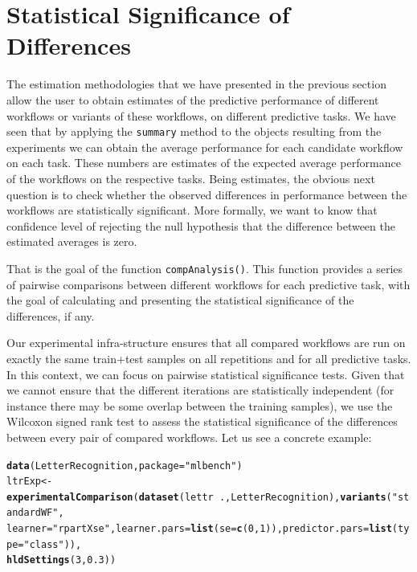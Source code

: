 \documentclass[10pt,a4paper]{article}\usepackage[]{graphicx}\usepackage[]{color}
\makeatletter
\newcommand{\hlnum}[1]{\textcolor[rgb]{0.686,0.059,0.569}{#1}}%
\newcommand{\hlstr}[1]{\textcolor[rgb]{0.192,0.494,0.8}{#1}}%
\newcommand{\hlopt}[1]{\textcolor[rgb]{0,0,0}{#1}}%
\newcommand{\hlstd}[1]{\textcolor[rgb]{0.345,0.345,0.345}{#1}}%
\newcommand{\hlkwb}[1]{\textcolor[rgb]{0.69,0.353,0.396}{#1}}%
\newcommand{\hlkwc}[1]{\textcolor[rgb]{0.333,0.667,0.333}{#1}}%
\newcommand{\hlkwd}[1]{\textcolor[rgb]{0.737,0.353,0.396}{\textbf{#1}}}%
\newenvironment{kframe}{%
 \def\at@end@of@kframe{}%
 \ifinner\ifhmode%
  \def\at@end@of@kframe{\end{minipage}}%
  \begin{minipage}{\columnwidth}%
 \fi\fi%
 \def\FrameCommand##1{\hskip\@totalleftmargin \hskip-\fboxsep
 \colorbox{shadecolor}{##1}\hskip-\fboxsep
     \hskip-\linewidth \hskip-\@totalleftmargin \hskip\columnwidth}%
 \MakeFramed {\advance\hsize-\width
   \@totalleftmargin\z@ \linewidth\hsize
   \@setminipage}}%
 {\par\unskip\endMakeFramed%
 \at@end@of@kframe}
\newenvironment{knitrout}{}{} %
\makeatother
\begin{document}
\section{Statistical Significance of Differences}

The estimation methodologies that we have presented in the previous
section allow the user to obtain estimates of the predictive
performance of different workflows or variants of these workflows, on
different predictive tasks. We have seen that by applying the
\texttt{summary} method to the objects resulting from the experiments
we can obtain the average performance for each candidate workflow on
each task. These numbers are estimates of the expected average
performance of the workflows on the respective tasks. Being estimates,
the obvious next question is to check whether the observed differences
in performance between the workflows are statistically
significant. More formally, we want to know that confidence level of rejecting the null hypothesis that the difference between the estimated averages is zero.

That is the goal of the function
\texttt{compAnalysis()}. This function provides a series of pairwise
comparisons between different workflows for each predictive task, with
the goal of calculating and presenting the statistical significance of
the differences, if any.

Our experimental infra-structure ensures that all compared workflows
are run on exactly the same train+test samples on all repetitions and
for all predictive tasks. In this context, we can focus on pairwise
statistical significance tests. Given that we cannot ensure that the
different iterations are statistically independent (for instance there
may be some overlap between the training samples), we use the Wilcoxon
signed rank test to assess the statistical significance of the
differences between every pair of compared workflows. Let us see a
concrete example:




\begin{knitrout}
\color{fgcolor}\begin{kframe}
\begin{alltt}
\hlkwd{data}\hlstd{(LetterRecognition,} \hlkwc{package} \hlstd{=} \hlstr{"mlbench"}\hlstd{)}
\hlstd{ltrExp} \hlkwb{<-} \hlkwd{experimentalComparison}\hlstd{(}\hlkwd{dataset}\hlstd{(lettr} \hlopt{~} \hlstd{., LetterRecognition),} \hlkwd{variants}\hlstd{(}\hlstr{"standardWF"}\hlstd{,}
    \hlkwc{learner} \hlstd{=} \hlstr{"rpartXse"}\hlstd{,} \hlkwc{learner.pars} \hlstd{=} \hlkwd{list}\hlstd{(}\hlkwc{se} \hlstd{=} \hlkwd{c}\hlstd{(}\hlnum{0}\hlstd{,} \hlnum{1}\hlstd{)),} \hlkwc{predictor.pars} \hlstd{=} \hlkwd{list}\hlstd{(}\hlkwc{type} \hlstd{=} \hlstr{"class"}\hlstd{)),}
    \hlkwd{hldSettings}\hlstd{(}\hlnum{3}\hlstd{,} \hlnum{0.3}\hlstd{))}
\end{alltt}
\end{kframe}
\end{knitrout}
\end{document}
